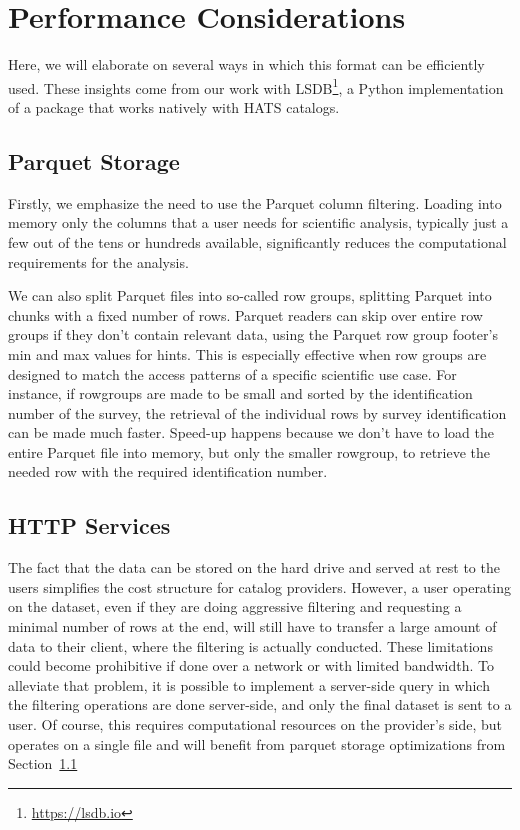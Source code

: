 \documentclass[11pt,a4paper]{ivoa}
\begin{document}
\section{Performance Considerations}
Here, we will elaborate on several ways in which this format can be efficiently used. These insights come from our work with LSDB\footnote{\url{https://lsdb.io}}, a Python implementation of a package that works natively with HATS catalogs. \par

\subsection{Parquet Storage}\label{sec:parquetPerformance}
Firstly, we emphasize the need to use the Parquet column filtering. 
Loading into memory only the columns that a user needs for scientific analysis, typically just a few out of the tens or hundreds available, significantly reduces the computational requirements for the analysis.  \par 

We can also split Parquet files into so-called row groups, splitting Parquet into chunks with a fixed number of rows. 
Parquet readers can skip over entire row groups if they don't contain relevant data, using the Parquet row group footer's min and max values for hints. 
This is especially effective when row groups are designed to match the access patterns of a specific scientific use case. 
For instance, if rowgroups are made to be small and sorted by the identification number of the survey, the retrieval of the individual rows by survey identification can be made much faster. 
Speed-up happens because we don't have to load the entire Parquet file into memory, but only the smaller rowgroup, to retrieve the needed row with the required identification number.\par 

\subsection{HTTP Services}
The fact that the data can be stored on the hard drive and served at rest to the users simplifies the cost structure for catalog providers. 
However, a user operating on the dataset, even if they are doing aggressive filtering and requesting a minimal number of rows at the end, will still have to transfer a large amount of data to their client, where the filtering is actually conducted. 
These limitations could become prohibitive if done over a network or with limited bandwidth. 
To alleviate that problem, it is possible to implement a server-side query in which the filtering operations are done server-side, and only the final dataset is sent to a user. 
Of course, this requires computational resources on the provider's side, but operates on a single file and will benefit from parquet storage optimizations from Section~\ref{sec:parquetPerformance}
\end{document}
